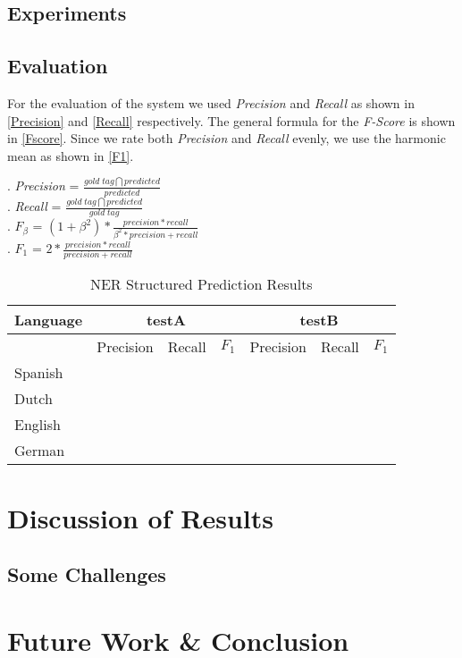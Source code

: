 \documentclass[11pt]{article}
\begin{document}
\subsection*{Experiments}


\subsection*{Evaluation}
For the evaluation of the system we used \emph{Precision} and \emph{Recall} as shown in \ref{Precision} and \ref{Recall} respectively.
The general formula for the \emph{F-Score} is shown in \ref{Fscore}. Since we rate both \emph{Precision} and \emph{Recall} evenly, we 
use the harmonic mean as shown in \ref{F1}.


\ex. \emph{Precision} = $ \frac{gold\; tag \bigcap predicted}{predicted}$ \label{Precision}\\


\ex. \emph{Recall} = $ \frac{gold \;tag \bigcap predicted}{gold\; tag}$ \label{Recall}\\


\ex. $F_{\beta}$ = $ (1+\beta^2)*\frac{precision *recall}{\beta^2* precision + recall}$ \label{Fscore}\\

\ex. $F_1$ = $ 2*\frac{precision *recall}{precision + recall}$ \label{F1}\\




\begin{table}[h!]
\scriptsize
\begin{tabular}{l |l| l| l| l| l| l}
 
\bf Language & \multicolumn{3}{c|}{ \bf testA}&\multicolumn{3}{c}{ \bf testB}\\\hline 
             & Precision & Recall & $F_1$ & Precision & Recall & $F_1$ \\ \hline
Spanish &       &          &     &          &               & \\
Dutch  &         &          &     &          &               &   \\
English &        &          &     &          &               &       \\
German &      &          &       &          &             & \\
\end{tabular}
\caption{NER Structured Prediction Results }
\label{table:Results}
\end{table}

\section{Discussion of Results}

\subsection*{Some Challenges} %


\section{Future Work \& Conclusion}






\end{document}
